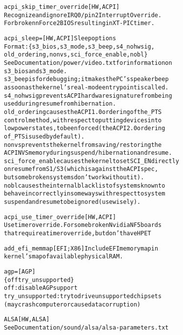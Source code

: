 \documentclass[a4paper,8pt,english]{sphinxmanual}
\begin{document}
\begin{alltt}
        acpi\_skip\_timer\_override {[}HW,ACPI{]}
                        Recognize and ignore IRQ0/pin2 Interrupt Override.
                        For broken nForce2 BIOS resulting in XT-PIC timer.

        acpi\_sleep=     {[}HW,ACPI{]} Sleep options
                        Format: \{ s3\_bios, s3\_mode, s3\_beep, s4\_nohwsig,
                                  old\_ordering, nonvs, sci\_force\_enable, nobl \}
                        See Documentation/power/video.txt for information on
                        s3\_bios and s3\_mode.
                        s3\_beep is for debugging; it makes the PC's speaker beep
                        as soon as the kernel's real-mode entry point is called.
                        s4\_nohwsig prevents ACPI hardware signature from being
                        used during resume from hibernation.
                        old\_ordering causes the ACPI 1.0 ordering of the \_PTS
                        control method, with respect to putting devices into
                        low power states, to be enforced (the ACPI 2.0 ordering
                        of \_PTS is used by default).
                        nonvs prevents the kernel from saving/restoring the
                        ACPI NVS memory during suspend/hibernation and resume.
                        sci\_force\_enable causes the kernel to set SCI\_EN directly
                        on resume from S1/S3 (which is against the ACPI spec,
                        but some broken systems don't work without it).
                        nobl causes the internal blacklist of systems known to
                        behave incorrectly in some ways with respect to system
                        suspend and resume to be ignored (use wisely).

        acpi\_use\_timer\_override {[}HW,ACPI{]}
                        Use timer override. For some broken Nvidia NF5 boards
                        that require a timer override, but don't have HPET

        add\_efi\_memmap  {[}EFI; X86{]} Include EFI memory map in
                        kernel's map of available physical RAM.

        agp=            {[}AGP{]}
                        \{ off \textbar{} try\_unsupported \}
                        off: disable AGP support
                        try\_unsupported: try to drive unsupported chipsets
                                (may crash computer or cause data corruption)

        ALSA            {[}HW,ALSA{]}
                        See Documentation/sound/alsa/alsa-parameters.txt


\end{alltt}
\end{document}
